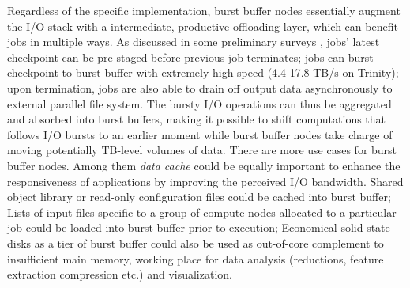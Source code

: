 

Regardless of the specific implementation, burst buffer nodes essentially augment
the I/O stack with a intermediate, productive offloading layer, 
which can benefit jobs in multiple ways.
As discussed in some preliminary surveys\cite{BBUseCase, apex-workflow} ,
jobs' latest checkpoint can be pre-staged
before previous job terminates;
jobs can burst checkpoint to burst buffer
with extremely high speed (4.4-17.8 TB/s on Trinity);
upon termination, jobs are also able to drain off output data
asynchronously to external parallel file system.
The bursty I/O operations can thus be aggregated and absorbed into burst buffers,
making it possible to shift computations that follows I/O bursts to an earlier moment
while burst buffer nodes take charge of moving potentially TB-level volumes of data.
There are more use cases for burst buffer nodes.
Among them \textit{data cache} could be equally important to enhance the responsiveness
of applications by improving the perceived I/O bandwidth\cite{BBUseCase}.
Shared object library or read-only configuration files could be
cached into burst buffer;
Lists of input files specific to a group of compute nodes allocated to
a particular job could be loaded into burst buffer prior to execution;
Economical solid-state disks as a tier of burst buffer could also be used as
out-of-core complement to insufficient main memory\cite{Romanus:CORR:15},
working place for data analysis (reductions, feature extraction compression etc.)
and visualization\cite{BBUseCase}.


